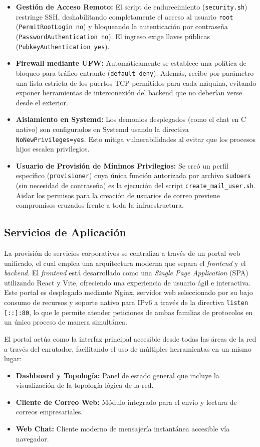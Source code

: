 \begin{itemize}
    \item \textbf{Gestión de Acceso Remoto:} El script de endurecimiento (\texttt{security.sh}) restringe SSH, deshabilitando completamente el acceso al usuario \texttt{root} (\texttt{PermitRootLogin no}) y bloqueando la autenticación por contraseña (\texttt{PasswordAuthentication no}). El ingreso exige llaves públicas (\texttt{PubkeyAuthentication yes}). 
    \item \textbf{Firewall mediante UFW:} Automáticamente se establece una política de bloqueo para tráfico entrante (\texttt{default deny}). Además, recibe por parámetro una lista estricta de los puertos TCP permitidos para cada máquina, evitando exponer herramientas de interconexión del backend que no deberían verse desde el exterior.
    \item \textbf{Aislamiento en Systemd:} Los demonios desplegados (como el chat en C nativo) son configurados en Systemd usando la directiva \texttt{NoNewPrivileges=yes}. Esto mitiga vulnerabilidades al evitar que los procesos hijos escalen privilegios.
    \item \textbf{Usuario de Provisión de Mínimos Privilegios:} Se creó un perfil específico (\texttt{provisioner}) cuya única función autorizada por archivo \texttt{sudoers} (sin necesidad de contraseña) es la ejecución del script \texttt{create\_mail\_user.sh}. Aislar los permisos para la creación de usuarios de correo previene compromisos cruzados frente a toda la infraestructura.
\end{itemize}

\subsection{Servicios de Aplicación}

La provisión de servicios corporativos se centraliza a través de un portal web unificado, el cual emplea una arquitectura moderna que separa el \textit{frontend} y el \textit{backend}. El \textit{frontend} está desarrollado como una \textit{Single Page Application} (SPA) utilizando React y Vite, ofreciendo una experiencia de usuario ágil e interactiva. Este portal es desplegado mediante Nginx, servidor web seleccionado por su bajo consumo de recursos y soporte nativo para IPv6 a través de la directiva \texttt{listen [::]:80}, lo que le permite atender peticiones de ambas familias de protocolos en un único proceso de manera simultánea. 

El portal actúa como la interfaz principal accesible desde todas las áreas de la red a través del enrutador, facilitando el uso de múltiples herramientas en un mismo lugar:
\begin{itemize}
    \item \textbf{Dashboard y Topología:} Panel de estado general que incluye la visualización de la topología lógica de la red.
    \item \textbf{Cliente de Correo Web:} Módulo integrado para el envío y lectura de correos empresariales.
    \item \textbf{Web Chat:} Cliente moderno de mensajería instantánea accesible vía navegador.
\end{itemize}

